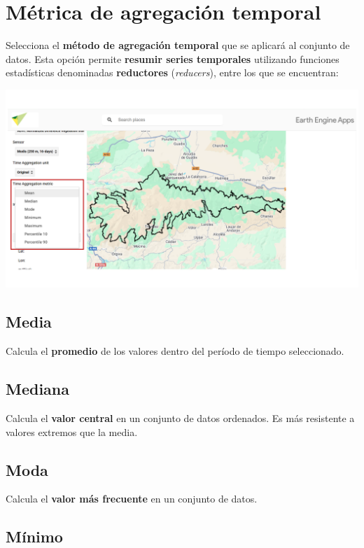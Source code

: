 \documentclass[
]{book}
\begin{document}
\chapter{Métrica de agregación temporal}\label{agregacion-temporal}

Selecciona el \textbf{método de agregación temporal} que se aplicará al conjunto de datos. Esta opción permite \textbf{resumir series temporales} utilizando funciones estadísticas denominadas \textbf{reductores} (\emph{reducers}), entre los que se encuentran:

\includegraphics{assets/aggregationTime.png}

\section{\texorpdfstring{\textbf{Media}}{Media}}\label{media}

Calcula el \textbf{promedio} de los valores dentro del período de tiempo seleccionado.

\section{\texorpdfstring{\textbf{Mediana}}{Mediana}}\label{mediana}

Calcula el \textbf{valor central} en un conjunto de datos ordenados. Es más resistente a valores extremos que la media.

\section{\texorpdfstring{\textbf{Moda}}{Moda}}\label{moda}

Calcula el \textbf{valor más frecuente} en un conjunto de datos.

\section{\texorpdfstring{\textbf{Mínimo}}{Mínimo}}\label{muxednimo}
\end{document}
